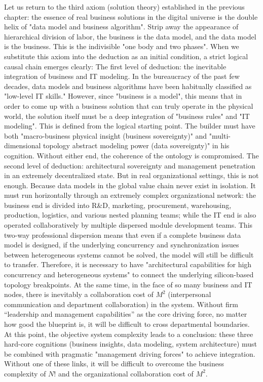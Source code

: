 \documentclass[11pt,a4paper]{article}
\begin{document}
Let us return to the third axiom (solution theory) established in the previous chapter: the essence of real business solutions in the digital universe is the double helix of "data model and business algorithm". Strip away the appearance of hierarchical division of labor, the business is the data model, and the data model is the business. This is the indivisible "one body and two phases". When we substitute this axiom into the deduction as an initial condition, a strict logical causal chain emerges clearly: The first level of deduction: the inevitable integration of business and IT modeling. In the bureaucracy of the past few decades, data models and business algorithms have been habitually classified as "low-level IT skills." However, since "business is a model", this means that in order to come up with a business solution that can truly operate in the physical world, the solution itself must be a deep integration of "business rules" and "IT modeling". This is defined from the logical starting point. The builder must have both "macro-business physical insight (business sovereignty)" and "multi-dimensional topology abstract modeling power (data sovereignty)" in his cognition. Without either end, the coherence of the ontology is compromised. The second level of deduction: architectural sovereignty and management penetration in an extremely decentralized state. But in real organizational settings, this is not enough. Because data models in the global value chain never exist in isolation. It must run horizontally through an extremely complex organizational network: the business end is divided into R\&D, marketing, procurement, warehousing, production, logistics, and various nested planning teams; while the IT end is also operated collaboratively by multiple dispersed module development teams. This two-way professional dispersion means that even if a complete business data model is designed, if the underlying concurrency and synchronization issues between heterogeneous systems cannot be solved, the model will still be difficult to transfer. Therefore, it is necessary to have "architectural capabilities for high concurrency and heterogeneous systems" to connect the underlying silicon-based topology breakpoints. At the same time, in the face of so many business and IT nodes, there is inevitably a collaboration cost of $M^2$ (interpersonal communication and department collaboration) in the system. Without firm “leadership and management capabilities” as the core driving force, no matter how good the blueprint is, it will be difficult to cross departmental boundaries. At this point, the objective system complexity leads to a conclusion: these three hard-core cognitions (business insights, data modeling, system architecture) must be combined with pragmatic "management driving forces" to achieve integration. Without one of these links, it will be difficult to overcome the business complexity of $N!$ and the organizational collaboration cost of $M^2$.
\end{document}

